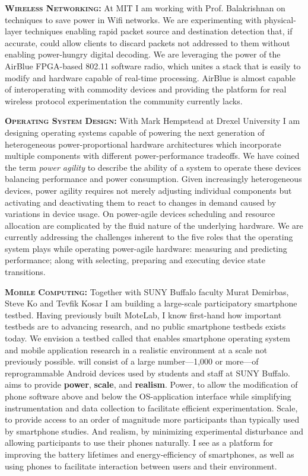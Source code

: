 \textbf{{\scshape Wireless Networking:}} At MIT I am working with Prof.
Balakrishnan on techniques to save power in Wifi networks. We are
experimenting with physical-layer techniques enabling rapid packet source and
destination detection that, if accurate, could allow clients to discard
packets not addressed to them without enabling power-hungry digital decoding.
We are leveraging the power of the AirBlue FPGA-based 802.11 software radio,
which unites a stack that is easily to modify and hardware capable of
real-time processing. AirBlue is almost capable of interoperating with
commodity devices and providing the platform for real
wireless protocol experimentation the community currently lacks.


\textbf{{\scshape Operating System Design:}} With Mark Hempstead at Drexel
University I am designing operating systems capable of powering the next
generation of heterogeneous power-proportional hardware architectures which
incorporate multiple components with different power-performance tradeoffs.
We have coined the term \textit{power agility} to describe the ability of a
system to operate these devices balancing performance and power consumption.
Given increasingly heterogeneous devices, power agility requires not merely
adjusting individual components but activating and deactivating them to react
to changes in demand caused by variations in device usage. On power-agile
devices scheduling and resource allocation are complicated by the fluid
nature of the underlying hardware. We are currently addressing the challenges
inherent to the five roles that the operating system plays while operating
power-agile hardware: measuring and predicting performance; along with
selecting, preparing and executing device state transitions.


\textbf{{\scshape Mobile Computing:}} Together with SUNY Buffalo faculty
Murat Demirbas, Steve Ko and Tevfik Kosar I am building a large-scale
participatory smartphone testbed. Having previously built MoteLab, I know
first-hand how important testbeds are to advancing research, and no public
smartphone testbeds exists today. We envision a testbed called \PhoneLab{}
that enables smartphone operating system and mobile application research in a
realistic environment at a scale not previously possible. \PhoneLab{} will
consist of a large number---1,000 or more---of reprogrammable Android devices
used by students and staff at SUNY Buffalo. \PhoneLab{} aims to provide
\textbf{power}, \textbf{scale}, and \textbf{realism}. Power, to allow the
modification of phone software above and below the OS-application interface
while simplifying instrumentation and data collection to facilitate efficient
experimentation. Scale, to provide access to an order of magnitude more
participants than typically used by smartphone studies. And realism, by
minimizing experimental disturbance and allowing participants to use their
phones naturally. I see \PhoneLab{} as a platform for improving the battery
lifetimes and energy-efficiency of smartphones, as well as using phones to
facilitate interaction between users and their environment.

